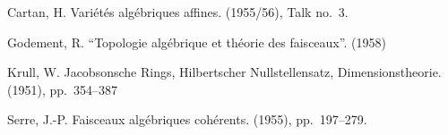\documentclass{article}
\theoremstyle{plain}
\theoremstyle{definition}
\begin{document}
\nocite{*}

\begin{thebibliography}{10}

  {\sc Cartan, H.}
  \newblock Vari\'{e}t\'{e}s alg\'{e}briques affines.
   (1955/56), Talk no.~3.

  {\sc Godement, R.}
  \newblock ``Topologie alg\'{e}brique et th\'{e}orie des faisceaux''.
   (1958)

  {\sc Krull, W.}
  \newblock Jacobsonsche Rings, Hilbertscher Nullstellensatz, Dimensionstheorie.
   (1951), pp.~354--387

  {\sc Serre, J.-P.}
  \newblock Faisceaux alg\'{e}briques coh\'{e}rents.
   (1955), pp.~197--279.

\end{thebibliography}
\end{document}
